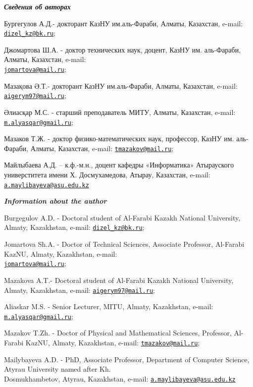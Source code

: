 \begin{authorinfo}
\emph{{\bfseries Сведения об авторах}}

Бургегулов А.Д.- докторант КазНУ им.аль-Фараби, Алматы, Казахстан,
e-mail: \href{mailto:dizel_kz@bk.ru}{\nolinkurl{dizel\_kz@bk.ru}};

Джомартова Ш.А. - доктор технических наук, доцент, КазНУ им. аль-Фараби,
Алматы, Казахстан, e-mail:\\
\href{mailto:jomartova@mail.ru}{\nolinkurl{jomartova@mail.ru}};

Мазақова Ә.Т.- докторант КазНУ им.аль-Фараби, Алматы, Казахстан, e-mail:
\href{mailto:aigerym97@mail.ru}{\nolinkurl{aigerym97@mail.ru}};

Әлиасқар М.С. - старший преподаватель МИТУ, Алматы, Казахстан, e-mail:
\href{mailto:m.alyasqar@gmail.ru}{\nolinkurl{m.alyasqar@gmail.ru}};

Мазаков Т.Ж. - доктор физико-математических наук, профессор, КазНУ им.
аль-Фараби, Алматы, Казахстан, e-mail:
\href{mailto:tmazakov@mail.ru}{\nolinkurl{tmazakov@mail.ru}};

Майлыбаева А.Д. -- к.ф.-м.н., доцент кафедры «Информатика» Атырауского
универститета имени Х. Досмухамедова, Атырау, Казахстан, e-mail:
\href{mailto:a.maylibayeva@asu.edu.kz}{\nolinkurl{a.maylibayeva@asu.edu.kz}}

\emph{{\bfseries Information about the author}}

Burgegulov A.D. - Doctoral student of Al-Farabi Kazakh National
University, Almaty, Kazakhstan, e-mail:
\href{mailto:dizel_kz@bk.ru}{\nolinkurl{dizel\_kz@bk.ru}};

Jomartova Sh.A. - Doctor of Technical Sciences, Associate Professor,
Al-Farabi KazNU, Almaty, Kazakhstan, e-mail:\\
\href{mailto:jomartova@mail.ru}{\nolinkurl{jomartova@mail.ru}};

Mazakova A.T.- Doctoral student of Al-Farabi Kazakh National University,
Almaty, Kazakhstan, e-mail:
\href{mailto:aigerym97@mail.ru}{\nolinkurl{aigerym97@mail.ru}};

Aliaskar M.S. - Senior Lecturer, MITU, Almaty, Kazakhstan, e-mail:
\href{mailto:m.alyasqar@gmail.ru}{\nolinkurl{m.alyasqar@gmail.ru}};

Mazakov T.Zh. - Doctor of Physical and Mathematical Sciences, Professor,
Al-Farabi KazNU, Almaty, Kazakhstan, e-mail:
\href{mailto:tmazakov@mail.ru}{\nolinkurl{tmazakov@mail.ru}};

Mailybayeva A.D. - PhD, Associate Professor, Department of Computer
Science, Atyrau University named after Kh. \\Dosmukhambetov, Atyrau,
Kazakhstan, e-mail:
\href{mailto:a.maylibayeva@asu.edu.kz}{\nolinkurl{a.maylibayeva@asu.edu.kz}}
\end{authorinfo}
